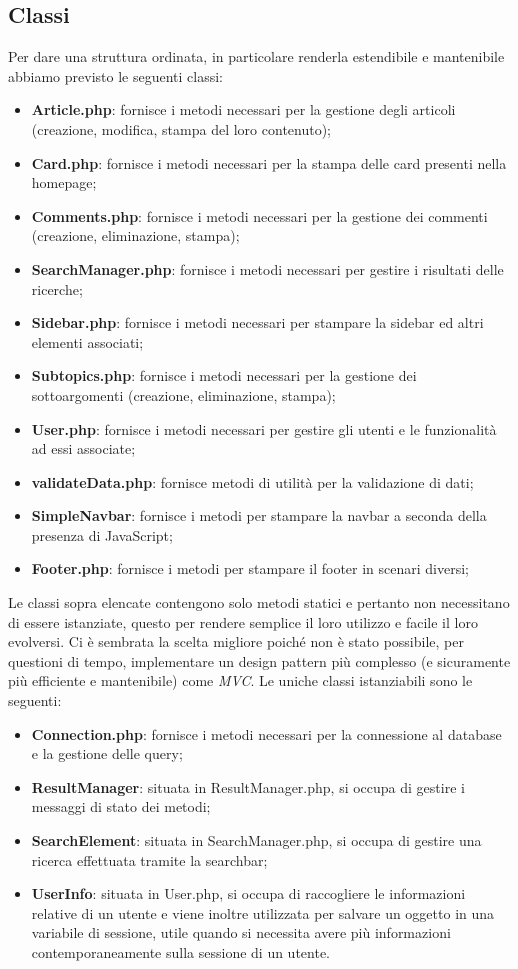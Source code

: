 \documentclass[12pt]{article}
\begin{document}
	\subsection{Classi}
	Per dare una struttura ordinata, in particolare renderla estendibile e mantenibile abbiamo previsto le seguenti classi:
		\begin{itemize}
			\item \textbf{Article.php}: fornisce i metodi necessari per la gestione degli articoli (creazione, modifica, stampa del loro contenuto);
			\item \textbf{Card.php}: fornisce i metodi necessari per la stampa delle card presenti nella homepage;
			\item \textbf{Comments.php}: fornisce i metodi necessari per la gestione dei commenti (creazione, eliminazione, stampa);
			\item \textbf{SearchManager.php}: fornisce i metodi necessari per gestire i risultati delle ricerche;
			\item \textbf{Sidebar.php}: fornisce i metodi necessari per stampare la sidebar ed altri elementi associati;
			\item \textbf{Subtopics.php}: fornisce i metodi necessari per la gestione dei sottoargomenti (creazione, eliminazione, stampa);
			\item \textbf{User.php}: fornisce i metodi necessari per gestire gli utenti e le funzionalità ad essi associate;
			\item \textbf{validateData.php}: fornisce metodi di utilità per la validazione di dati;
			\item \textbf{SimpleNavbar}: fornisce i metodi per stampare la navbar a seconda della presenza di JavaScript;
			\item \textbf{Footer.php}: fornisce i metodi per stampare il footer in scenari diversi;
		\end{itemize}
	Le classi sopra elencate contengono solo metodi statici e pertanto non necessitano di essere istanziate, questo per rendere semplice il loro utilizzo e facile il loro evolversi. Ci è sembrata la scelta migliore poiché non è stato possibile, per questioni di tempo, implementare un design pattern più complesso (e sicuramente più efficiente e mantenibile) come \emph{MVC}.
	Le uniche classi istanziabili sono le seguenti:
	\begin{itemize}
		\item \textbf{Connection.php}: fornisce i metodi necessari per la connessione al database e la gestione delle query;
		\item \textbf{ResultManager}: situata in ResultManager.php, si occupa di gestire i messaggi di stato dei metodi;
		\item \textbf{SearchElement}: situata in SearchManager.php, si occupa di gestire una ricerca effettuata tramite la searchbar;
		\item \textbf{UserInfo}: situata in User.php, si occupa di raccogliere le informazioni relative di un utente e viene inoltre utilizzata per salvare un oggetto in una variabile di sessione, utile quando si necessita avere più informazioni contemporaneamente sulla sessione di un utente.
	\end{itemize}
\end{document}
